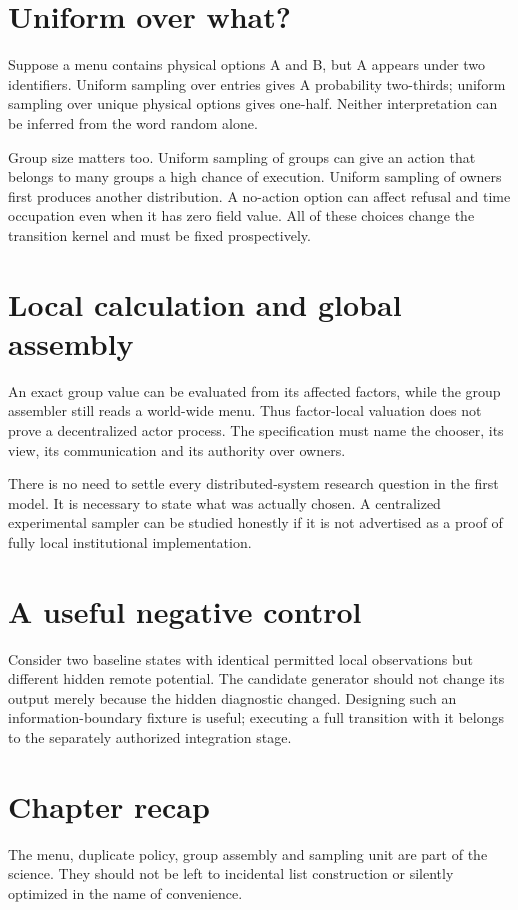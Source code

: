 \section{Uniform over what?}
Suppose a menu contains physical options A and B, but A appears under two
identifiers. Uniform sampling over entries gives A probability two-thirds;
uniform sampling over unique physical options gives one-half. Neither
interpretation can be inferred from the word random alone.

Group size matters too. Uniform sampling of groups can give an action that
belongs to many groups a high chance of execution. Uniform sampling of
owners first produces another distribution. A no-action option can affect
refusal and time occupation even when it has zero field value. All of these
choices change the transition kernel and must be fixed prospectively.

\section{Local calculation and global assembly}
An exact group value can be evaluated from its affected factors, while the
group assembler still reads a world-wide menu. Thus factor-local valuation
does not prove a decentralized actor process. The specification must name
the chooser, its view, its communication and its authority over owners.

There is no need to settle every distributed-system research question in
the first model. It is necessary to state what was actually chosen. A
centralized experimental sampler can be studied honestly if it is not
advertised as a proof of fully local institutional implementation.

\section*{A useful negative control}
Consider two baseline states with identical permitted local observations
but different hidden remote potential. The candidate generator should not
change its output merely because the hidden diagnostic changed. Designing
such an information-boundary fixture is useful; executing a full transition
with it belongs to the separately authorized integration stage.

\section*{Chapter recap}
The menu, duplicate policy, group assembly and sampling unit are part of
the science. They should not be left to incidental list construction or
silently optimized in the name of convenience.
